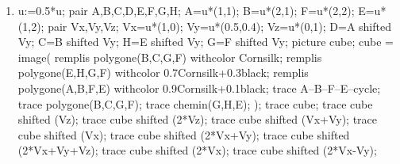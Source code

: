 \begin{exercice*}
\begin{multicols}{2}
\begin{enumerate}
\begin{Geometrie}[CoinHD={(5u,4u)}]
                A=u*(1,1);
                B=u*(2,1);
                F=u*(2,2);
                E=u*(1,2);
                pair Vx,Vy,Vz;
                Vx=u*(1,0);
                Vy=u*(0.5,0.4);
                Vz=u*(0,1);
                D=A shifted Vy;
                C=B shifted Vy;
                H=E shifted Vy;
                G=F shifted Vy;
                picture cube;
                cube = image(
                    remplis polygone(B,C,G,F) withcolor Cornsilk;
                    remplis polygone(E,H,G,F) withcolor 0.7Cornsilk+0.3black;
                    remplis polygone(A,B,F,E) withcolor 0.9Cornsilk+0.1black;
                    trace A--B--F--E--cycle;
                    trace polygone(B,C,G,F);
                    trace chemin(G,H,E);
                );        
                trace cube;
                trace cube shifted (Vx+Vy);
                trace cube shifted (Vx);
                trace cube shifted (Vx+Vy+Vz);
                trace cube shifted (Vx+Vy+2*Vz);
                trace cube shifted (2*Vx+Vy);
                trace cube shifted (3*Vx+Vy);
                trace cube shifted (3*Vx);
            \end{Geometrie}
            \item
            \begin{Geometrie}[CoinHD={(5u,4u)}]
                u:=0.5*u;
                pair A,B,C,D,E,F,G,H;
                A=u*(1,1);
                B=u*(2,1);
                F=u*(2,2);
                E=u*(1,2);
                pair Vx,Vy,Vz;
                Vx=u*(1,0);
                Vy=u*(0.5,0.4);
                Vz=u*(0,1);
                D=A shifted Vy;
                C=B shifted Vy;
                H=E shifted Vy;
                G=F shifted Vy;
                picture cube;
                cube = image(
                    remplis polygone(B,C,G,F) withcolor Cornsilk;
                    remplis polygone(E,H,G,F) withcolor 0.7Cornsilk+0.3black;
                    remplis polygone(A,B,F,E) withcolor 0.9Cornsilk+0.1black;
                    trace A--B--F--E--cycle;
                    trace polygone(B,C,G,F);
                    trace chemin(G,H,E);
                );        
                trace cube;
                trace cube shifted (Vz);
                trace cube shifted (2*Vz);
                trace cube shifted (Vx+Vy);
                trace cube shifted (Vx);
                trace cube shifted (2*Vx+Vy);
                trace cube shifted (2*Vx+Vy+Vz);
                trace cube shifted (2*Vx);
                trace cube shifted (2*Vx-Vy);
            \end{Geometrie}

\end{enumerate}
\end{multicols}
\end{exercice*}
